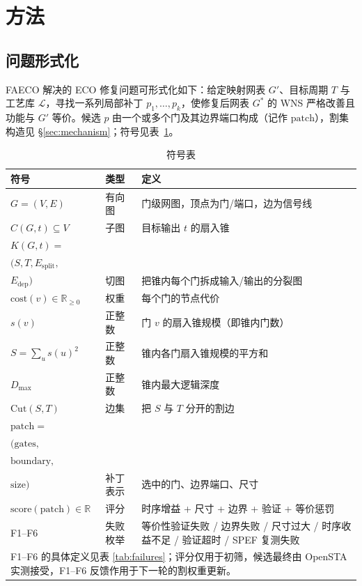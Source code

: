 \documentclass[journal]{IEEEtran}
\begin{document}
\section{方法}

\subsection{问题形式化}
FAECO 解决的 ECO 修复问题可形式化如下：给定映射网表 $G'$、目标周期 $T$ 与工艺库 $\mathcal{L}$，寻找一系列局部补丁 $p_1,\dots,p_k$，使修复后网表 $G^*$ 的 WNS 严格改善且功能与 $G'$ 等价。候选 $p$ 由一个或多个门及其边界端口构成（记作 $\mathrm{patch}$），割集构造见 \S\ref{sec:mechanism}；符号见表~\ref{tab:symbols}。

\begin{table}[!t]
\centering
\caption{符号表}
\label{tab:symbols}
\scriptsize
\setlength{\tabcolsep}{2pt}
\begin{tabular}{p{3.4cm}p{1.5cm}p{3.4cm}}
\toprule
\textbf{符号} & \textbf{类型} & \textbf{定义} \\
\midrule
$G = (V, E)$ & 有向图 & 门级网图，顶点为门/端口，边为信号线 \\
$C(G, t) \subseteq V$ & 子图 & 目标输出 $t$ 的扇入锥 \\
$K(G, t) =$ \\
$(S, T, E_{\mathrm{split}},$ \\
$E_{\mathrm{dep}})$ & 切图 & 把锥内每个门拆成输入/输出的分裂图 \\
$\mathrm{cost}(v) \in \mathbb{R}_{\geq 0}$ & 权重 & 每个门的节点代价 \\
$s(v)$ & 正整数 & 门 $v$ 的扇入锥规模（即锥内门数）\\
$S = \sum_u s(u)^2$ & 正整数 & 锥内各门扇入锥规模的平方和 \\

$D_{\max}$ & 正整数 & 锥内最大逻辑深度 \\
$\mathrm{Cut}(S, T)$ & 边集 & 把 $S$ 与 $T$ 分开的割边 \\
$\mathrm{patch} =$ \\
$(\mathrm{gates},$ \\
$\mathrm{boundary},$ \\
$\mathrm{size})$ & 补丁表示 & 选中的门、边界端口、尺寸 \\
$\mathrm{score}(\mathrm{patch}) \in \mathbb{R}$ & 评分 & 时序增益 + 尺寸 + 边界 + 验证 + 等价惩罚 \\
F1--F6 & 失败枚举 & 等价性验证失败 / 边界失败 / 尺寸过大 / 时序收益不足 / 验证超时 / SPEF 复测失败 \\
\bottomrule
\multicolumn{3}{p{8.0cm}}{\footnotesize F1--F6 的具体定义见表 \ref{tab:failures}；评分仅用于初筛，候选最终由 OpenSTA 实测接受，F1--F6 反馈作用于下一轮的割权重更新。}\\
\end{tabular}
\end{table}
\end{document}
